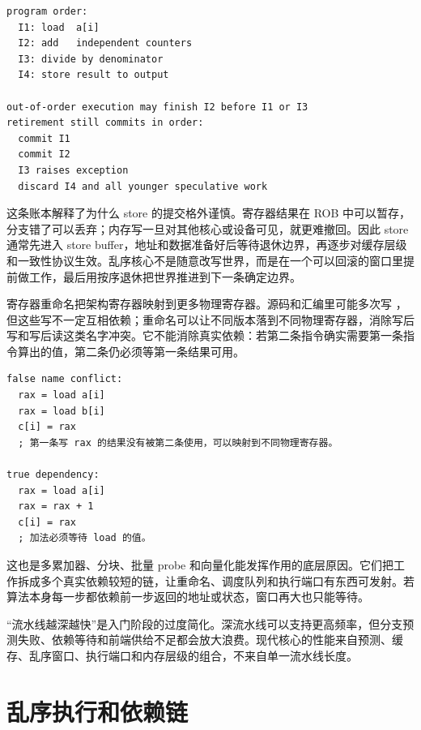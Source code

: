 \begin{lstlisting}[numbers=none,caption={按序退休让异常边界保持精确}]
program order:
  I1: load  a[i]
  I2: add   independent counters
  I3: divide by denominator
  I4: store result to output

out-of-order execution may finish I2 before I1 or I3
retirement still commits in order:
  commit I1
  commit I2
  I3 raises exception
  discard I4 and all younger speculative work
\end{lstlisting}

这条账本解释了为什么 store 的提交格外谨慎。寄存器结果在 ROB 中可以暂存，分支错了可以丢弃；内存写一旦对其他核心或设备可见，就更难撤回。因此 store 通常先进入 store buffer，地址和数据准备好后等待退休边界，再逐步对缓存层级和一致性协议生效。乱序核心不是随意改写世界，而是在一个可以回滚的窗口里提前做工作，最后用按序退休把世界推进到下一条确定边界。

寄存器重命名把架构寄存器映射到更多物理寄存器。源码和汇编里可能多次写 ，但这些写不一定互相依赖；重命名可以让不同版本落到不同物理寄存器，消除写后写和写后读这类名字冲突。它不能消除真实依赖：若第二条指令确实需要第一条指令算出的值，第二条仍必须等第一条结果可用。

\begin{lstlisting}[numbers=none,caption={重命名能拆开的依赖和拆不开的依赖}]
false name conflict:
  rax = load a[i]
  rax = load b[i]
  c[i] = rax
  ; 第一条写 rax 的结果没有被第二条使用，可以映射到不同物理寄存器。

true dependency:
  rax = load a[i]
  rax = rax + 1
  c[i] = rax
  ; 加法必须等待 load 的值。
\end{lstlisting}

这也是多累加器、分块、批量 probe 和向量化能发挥作用的底层原因。它们把工作拆成多个真实依赖较短的链，让重命名、调度队列和执行端口有东西可发射。若算法本身每一步都依赖前一步返回的地址或状态，窗口再大也只能等待。

\begin{deepdive}
“流水线越深越快”是入门阶段的过度简化。深流水线可以支持更高频率，但分支预测失败、依赖等待和前端供给不足都会放大浪费。现代核心的性能来自预测、缓存、乱序窗口、执行端口和内存层级的组合，不来自单一流水线长度。
\end{deepdive}

\section{乱序执行和依赖链}

